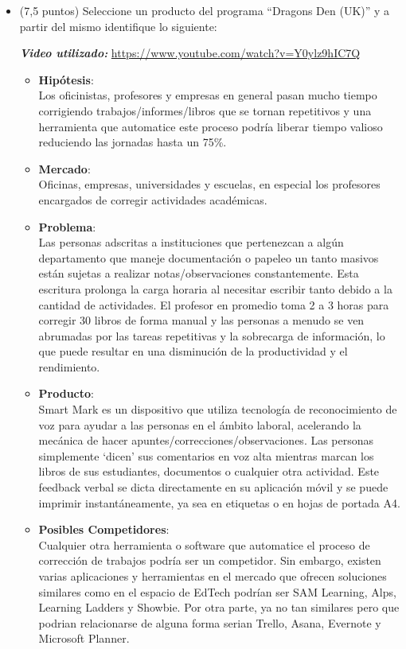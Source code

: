 \documentclass[a4paper,12pt]{article}
\begin{document}
\begin{itemize}

\item (7,5 puntos) Seleccione un producto del programa “Dragons Den (UK)” y a partir del mismo identifique lo siguiente:

\textit{\textbf{Video utilizado:}} \url{https://www.youtube.com/watch?v=Y0ylz9hIC7Q}
\begin{itemize}
\item \textbf{Hipótesis}: \\ 
Los oficinistas, profesores y empresas en general pasan mucho tiempo corrigiendo trabajos/informes/libros que se tornan repetitivos y una herramienta que automatice este proceso podría liberar tiempo valioso reduciendo las jornadas hasta un 75\%.

\item \textbf{Mercado}: \\
Oficinas, empresas, universidades y escuelas, en especial los profesores encargados de corregir actividades académicas.

\item \textbf{Problema}: \\
Las personas adscritas a instituciones que pertenezcan a algún departamento que maneje documentación o papeleo un tanto masivos están sujetas a realizar notas/observaciones constantemente. Esta escritura prolonga la carga horaria al necesitar escribir tanto debido a la cantidad de actividades. El profesor en promedio toma 2 a 3 horas para corregir 30 libros de forma manual y las personas a menudo se ven abrumadas por las tareas repetitivas y la sobrecarga de información, lo que puede resultar en una disminución de la productividad y el rendimiento.

\item \textbf{Producto}: \\
Smart Mark es un dispositivo que utiliza tecnología de reconocimiento de voz para ayudar a las personas en el ámbito laboral, acelerando la mecánica de hacer apuntes/correcciones/observaciones. Las personas simplemente ‘dicen’ sus comentarios en voz alta mientras marcan los libros de sus estudiantes, documentos o cualquier otra actividad. Este feedback verbal se dicta directamente en su aplicación móvil y se puede imprimir instantáneamente, ya sea en etiquetas o en hojas de portada A4.

\item \textbf{Posibles Competidores}: \\
Cualquier otra herramienta o software que automatice el proceso de corrección de trabajos podría ser un competidor. Sin embargo, existen varias aplicaciones y herramientas en el mercado que ofrecen soluciones similares como en el espacio de EdTech podrían ser SAM Learning, Alps, Learning Ladders y Showbie. Por otra parte, ya no tan similares pero que podrian relacionarse de alguna forma serian Trello, Asana, Evernote y Microsoft Planner.


\end{itemize}
\end{itemize}
\end{document}
